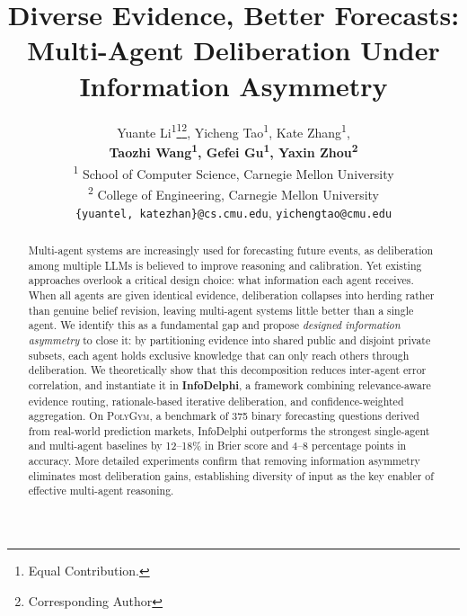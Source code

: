 \documentclass[11pt]{article}
\title{Diverse Evidence, Better Forecasts: \\ Multi-Agent Deliberation Under Information Asymmetry}
\author{Yuante Li\textsuperscript{\rm 1}\thanks{Equal Contribution.}\thanks{Corresponding Author},\hspace{4pt} Yicheng Tao\textsuperscript{\rm 1}\footnotemark[1],\hspace{4pt} Kate Zhang\textsuperscript{\rm 1}\footnotemark[1], \\
\textbf{Taozhi Wang\textsuperscript{\rm 1}, \hspace{4pt}Gefei Gu\textsuperscript{\rm 1}, \hspace{4pt}Yaxin Zhou\textsuperscript{\rm 2}} \\
\textsuperscript{\rm 1} School of Computer Science, Carnegie Mellon University \\
\textsuperscript{\rm 2} College of Engineering, Carnegie Mellon University \\
\texttt{\{yuantel, katezhan\}@cs.cmu.edu}, \texttt{yichengtao@cmu.edu}
}
\theoremstyle{plain}
\theoremstyle{definition}
\begin{document}
\maketitle
\begin{abstract}
Multi-agent systems are increasingly used for forecasting future events, as deliberation among multiple LLMs is believed to improve reasoning and calibration. Yet existing approaches overlook a critical design choice: what information each agent receives.
When all agents are given identical evidence, deliberation collapses into herding rather than genuine belief revision, leaving multi-agent systems little better than a single agent. 
We identify this as a fundamental gap and propose \textit{designed information asymmetry} to close it: by partitioning evidence into shared public and disjoint private subsets, each agent holds exclusive knowledge that can only reach others through deliberation.
We theoretically show that this decomposition reduces inter-agent error correlation, and instantiate it in \textbf{InfoDelphi}, a framework combining relevance-aware evidence routing, rationale-based iterative deliberation, and confidence-weighted aggregation.
On \textsc{PolyGym}, a benchmark of 375 binary forecasting questions derived from real-world prediction markets, InfoDelphi outperforms the strongest single-agent and multi-agent baselines by 12--18\% in Brier score and 4--8 percentage points in accuracy.
More detailed experiments confirm that removing information asymmetry eliminates most deliberation gains, establishing diversity of input as the key enabler of effective multi-agent reasoning.
\end{abstract}
\end{document}
